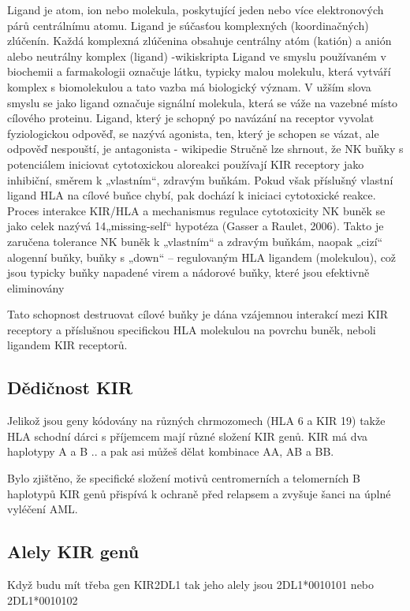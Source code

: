 \documentclass[czech,DP]{thesiskiv}
\begin{document}
Ligand je atom, ion nebo molekula, poskytující jeden nebo více elektronových párů centrálnímu atomu. Ligand je súčasťou komplexných (koordinačných) zlúčenín. Každá komplexná zlúčenina obsahuje centrálny atóm (katión) a anión alebo neutrálny komplex (ligand)
-wikiskripta
Ligand ve smyslu používaném v biochemii a farmakologii označuje látku, typicky malou molekulu, která vytváří komplex s biomolekulou a tato vazba má biologický význam. V užším slova smyslu se jako ligand označuje signální molekula, která se váže na vazebné místo cílového proteinu. Ligand, který je schopný po navázání na receptor vyvolat fyziologickou odpověď, se nazývá agonista, ten, který je schopen se vázat, ale odpověď nespouští, je antagonista
- wikipedie
Stručně lze shrnout, že NK buňky s potenciálem iniciovat cytotoxickou aloreakci používají
KIR receptory jako inhibiční, směrem k „vlastním“, zdravým buňkám. Pokud však příslušný
vlastní ligand HLA na cílové buňce chybí, pak dochází k iniciaci cytotoxické reakce. Proces
interakce KIR/HLA a mechanismus regulace cytotoxicity NK buněk se jako celek nazývá
14„missing-self“ hypotéza (Gasser a Raulet, 2006). Takto je zaručena tolerance NK buněk k
„vlastním“ a zdravým buňkám, naopak „cizí“ alogenní buňky, buňky s „down“ –
regulovaným
HLA ligandem (molekulou), což jsou typicky buňky napadené virem a
nádorové buňky, které jsou efektivně eliminovány

 Tato schopnost destruovat cílové buňky je dána
vzájemnou interakcí mezi KIR receptory a příslušnou specifickou
HLA molekulou na povrchu buněk, neboli ligandem KIR receptorů.

\subsection{Dědičnost KIR}
Jelikož jsou geny kódovány na různých chrmozomech (HLA 6 a KIR 19) takže HLA schodní dárci s příjemcem mají různé složení KIR genů.
KIR má dva haplotypy A a B .. a pak asi můžeš dělat kombinace AA, AB a BB.






Bylo zjištěno, že
specifické složení motivů centromerních a telomerních B haplotypů KIR genů přispívá
k ochraně před relapsem a zvyšuje šanci na úplné vyléčení AML.




\subsection{Alely KIR genů}
Když budu mít třeba gen KIR2DL1
tak jeho alely jsou 2DL1*0010101 nebo 2DL1*0010102
\end{document}

